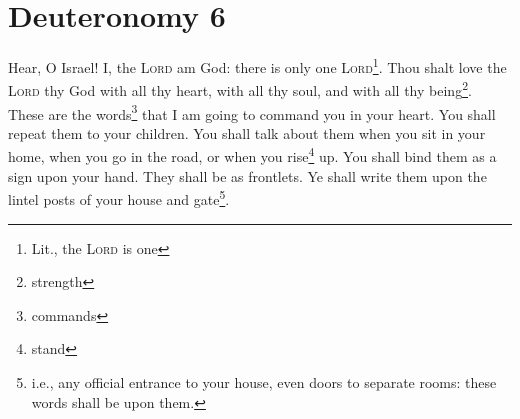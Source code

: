 \section{Deuteronomy 6}\label{Deuteronomy 6}
\begin{enumerate}[align=center]
     Hear, O Israel! I, the \textsc{Lord} am God: there is only one \textsc{Lord}\footnote{Lit., the \textsc{Lord} is one}.%
     Thou shalt love the \textsc{Lord} thy God with all thy heart, with all thy soul, and with all thy being\footnote{strength}.%
     These are the words\footnote{commands} that I am going to command you in your heart.%
     You shall repeat them to your children. You shall talk about them when you sit in your home, when you go in the road, or when you rise\footnote{stand} up.%
     You shall bind them as a sign upon your hand. They shall be as frontlets.%
     Ye shall write them upon the lintel posts of your house and gate\footnote{i.e., any official entrance to your house, even doors to separate rooms: these words shall be upon them.}.%
\end{enumerate}

